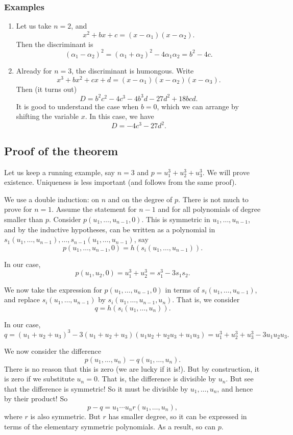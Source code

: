 \documentclass[11pt]{article}
\begin{document}
\subsubsection{Examples}
\label{sec:org030ebda}
\begin{enumerate}
\item Let us take \(n = 2\), and
\[ x^2 +bx + c = (x-\alpha_{1})(x-\alpha_{2}).\]
Then the discriminant is
\[ (\alpha_{1}-\alpha_{2})^2 = (\alpha_{1}+\alpha_{2})^2 - 4\alpha_{1}\alpha_{2} = b^{2}-4c.\]
\item Already for \(n = 3\), the discriminant is humongous.
Write
\[ x^{3} + bx^{2} + cx + d = (x-\alpha_{1})(x-\alpha_{2})(x-\alpha_{3}).\]
Then (it turns out)
\[ D = b^2c^2-4c^3-4b^3d-27d^2+18bcd.\]
It is good to understand the case when \(b = 0\), which we can arrange by shifting the variable \(x\).
In this case, we have
\[ D = -4c^3-27d^2.\]
\end{enumerate}
\subsection{Proof of the theorem}
\label{sec:org302edb5}
Let us keep a running example, say \(n = 3\) and \(p = u_{1}^3+u_{2}^3+u_{3}^{3}\).
We will prove existence.  Uniqueness is less important (and follows from the same proof).

We use a double induction: on \(n\) and on the degree of \(p\).
There is not much to prove for \(n = 1\).
Assume the statement for \(n-1\) and for all polynomials of degree smaller than \(p\).
Consider \(p(u_{1}, \dots, u_{n-1},0)\).
This is symmetric in \(u_{1}, \dots, u_{n-1}\), and by the inductive hypotheses, can be written as a polynomial in \(s_{1}(u_{1}, \dots, u_{n-1}), \dots, s_{n-1}(u_{1}, \dots, u_{n-1})\), say
\[ p(u_{1}, \dots, u_{n-1}, 0) = h(s_{i}(u_{1}, \dots, u_{n-1})).\]

In our case,
\[p(u_{1},u_{2}, 0) = u_{1}^{3}+u_{2}^3 = s_{1}^{3}-3s_{1}s_{2}.\]

We now take the expression for \(p(u_{1}, \dots, u_{n-1}, 0)\) in terms of \(s_{i}(u_{1}, \dots, u_{n-1})\), and replace \(s_{i}(u_{1}, \dots, u_{n-1})\) by \(s_{i}(u_{1}, \dots, u_{n-1}, u_{n})\).
That is, we consider
\[ q = h(s_{i}(u_{1}, \dots, u_{n})).\]

In our case,
\[ q = (u_{1}+u_{2}+u_{3})^3 - 3(u_{1}+u_{2}+u_{3})(u_{1}u_{2} +u_{2}u_{3} + u_{1}u_{3}) = u_{1}^{3}+u_{2}^{3}+u_{3}^{3} - 3u_{1}u_{2}u_{3}. \]

We now consider the difference
\[ p(u_{1}, \dots, u_{n}) - q(u_{1}, \dots, u_{n}).\]
There is no reason that this is zero (we are lucky if it is!).
But by construction, it is zero if we substitute \(u_{n} = 0\).
That is, the difference is divisible by \(u_{n}\).
But see that the difference is symmetric!
So it must be divisible by \(u_{1}, \dots, u_{n}\), and hence by their product!
So
\[ p-q = u_{1}\cdots u_{n} r(u_{1}, \dots, u_{n}),\]
where \(r\) is also symmetric.
But \(r\) has smaller degree, so it can be expressed in terms of the elementary symmetric polynomials.
As a result, so can \(p\).
\end{document}

